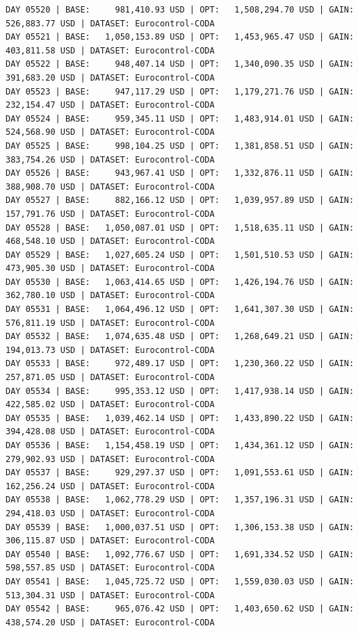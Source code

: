 \documentclass[11pt,a4paper]{article}
\begin{document}
\begin{verbatim}
DAY 05520 | BASE:     981,410.93 USD | OPT:   1,508,294.70 USD | GAIN: 526,883.77 USD | DATASET: Eurocontrol-CODA
DAY 05521 | BASE:   1,050,153.89 USD | OPT:   1,453,965.47 USD | GAIN: 403,811.58 USD | DATASET: Eurocontrol-CODA
DAY 05522 | BASE:     948,407.14 USD | OPT:   1,340,090.35 USD | GAIN: 391,683.20 USD | DATASET: Eurocontrol-CODA
DAY 05523 | BASE:     947,117.29 USD | OPT:   1,179,271.76 USD | GAIN: 232,154.47 USD | DATASET: Eurocontrol-CODA
DAY 05524 | BASE:     959,345.11 USD | OPT:   1,483,914.01 USD | GAIN: 524,568.90 USD | DATASET: Eurocontrol-CODA
DAY 05525 | BASE:     998,104.25 USD | OPT:   1,381,858.51 USD | GAIN: 383,754.26 USD | DATASET: Eurocontrol-CODA
DAY 05526 | BASE:     943,967.41 USD | OPT:   1,332,876.11 USD | GAIN: 388,908.70 USD | DATASET: Eurocontrol-CODA
DAY 05527 | BASE:     882,166.12 USD | OPT:   1,039,957.89 USD | GAIN: 157,791.76 USD | DATASET: Eurocontrol-CODA
DAY 05528 | BASE:   1,050,087.01 USD | OPT:   1,518,635.11 USD | GAIN: 468,548.10 USD | DATASET: Eurocontrol-CODA
DAY 05529 | BASE:   1,027,605.24 USD | OPT:   1,501,510.53 USD | GAIN: 473,905.30 USD | DATASET: Eurocontrol-CODA
DAY 05530 | BASE:   1,063,414.65 USD | OPT:   1,426,194.76 USD | GAIN: 362,780.10 USD | DATASET: Eurocontrol-CODA
DAY 05531 | BASE:   1,064,496.12 USD | OPT:   1,641,307.30 USD | GAIN: 576,811.19 USD | DATASET: Eurocontrol-CODA
DAY 05532 | BASE:   1,074,635.48 USD | OPT:   1,268,649.21 USD | GAIN: 194,013.73 USD | DATASET: Eurocontrol-CODA
DAY 05533 | BASE:     972,489.17 USD | OPT:   1,230,360.22 USD | GAIN: 257,871.05 USD | DATASET: Eurocontrol-CODA
DAY 05534 | BASE:     995,353.12 USD | OPT:   1,417,938.14 USD | GAIN: 422,585.02 USD | DATASET: Eurocontrol-CODA
DAY 05535 | BASE:   1,039,462.14 USD | OPT:   1,433,890.22 USD | GAIN: 394,428.08 USD | DATASET: Eurocontrol-CODA
DAY 05536 | BASE:   1,154,458.19 USD | OPT:   1,434,361.12 USD | GAIN: 279,902.93 USD | DATASET: Eurocontrol-CODA
DAY 05537 | BASE:     929,297.37 USD | OPT:   1,091,553.61 USD | GAIN: 162,256.24 USD | DATASET: Eurocontrol-CODA
DAY 05538 | BASE:   1,062,778.29 USD | OPT:   1,357,196.31 USD | GAIN: 294,418.03 USD | DATASET: Eurocontrol-CODA
DAY 05539 | BASE:   1,000,037.51 USD | OPT:   1,306,153.38 USD | GAIN: 306,115.87 USD | DATASET: Eurocontrol-CODA
DAY 05540 | BASE:   1,092,776.67 USD | OPT:   1,691,334.52 USD | GAIN: 598,557.85 USD | DATASET: Eurocontrol-CODA
DAY 05541 | BASE:   1,045,725.72 USD | OPT:   1,559,030.03 USD | GAIN: 513,304.31 USD | DATASET: Eurocontrol-CODA
DAY 05542 | BASE:     965,076.42 USD | OPT:   1,403,650.62 USD | GAIN: 438,574.20 USD | DATASET: Eurocontrol-CODA

\end{verbatim}
\end{document}

